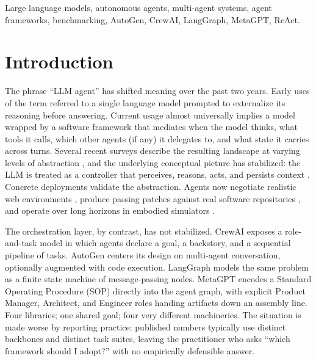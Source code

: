 \documentclass[conference]{IEEEtran}
\begin{document}
\begin{IEEEkeywords}
Large language models, autonomous agents, multi-agent systems, agent
frameworks, benchmarking, AutoGen, CrewAI, LangGraph, MetaGPT, ReAct.
\end{IEEEkeywords}

\section{Introduction}
The phrase ``LLM agent'' has shifted meaning over the past two years.
Early uses of the term referred to a single language model prompted to
externalize its reasoning before answering. Current usage almost
universally implies a model wrapped by a software framework that
mediates when the model thinks, what tools it calls, which other
agents (if any) it delegates to, and what state it carries across
turns. Several recent surveys describe the resulting landscape at
varying levels of abstraction \cite{wang2024agentsurvey,
xi2025potential, abouali2025agentic}, and the underlying conceptual
picture has stabilized: the LLM is treated as a controller that
perceives, reasons, acts, and persists context \cite{sumers2024coala}.
Concrete deployments validate the abstraction. Agents now negotiate
realistic web environments \cite{zhou2024webarena}, produce passing
patches against real software repositories \cite{yang2024sweagent},
and operate over long horizons in embodied simulators
\cite{wang2024voyager}.

The orchestration layer, by contrast, has not stabilized. CrewAI
exposes a role-and-task model in which agents declare a goal, a
backstory, and a sequential pipeline of tasks. AutoGen
\cite{wu2024autogen} centers its design on multi-agent conversation,
optionally augmented with code execution. LangGraph models the same
problem as a finite state machine of message-passing nodes. MetaGPT
\cite{hong2024metagpt} encodes a Standard Operating Procedure (SOP)
directly into the agent graph, with explicit Product Manager,
Architect, and Engineer roles handing artifacts down an assembly line.
Four libraries; one shared goal; four very different machineries. The
situation is made worse by reporting practice: published numbers
typically use distinct backbones and distinct task suites, leaving the
practitioner who asks ``which framework should I adopt?'' with no
empirically defensible answer.
\end{document}
